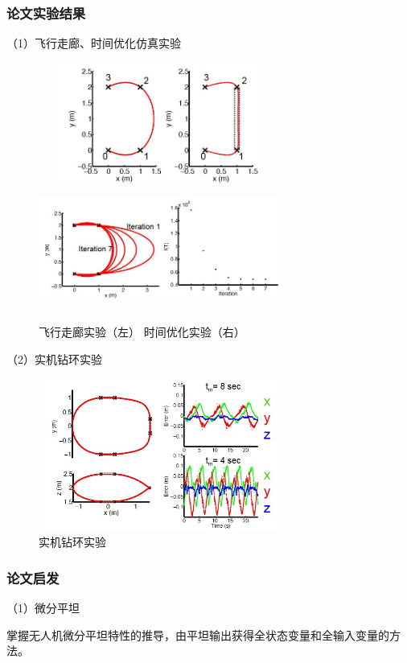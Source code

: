 \subsubsection{论文实验结果}
（1）飞行走廊、时间优化仿真实验
\begin{figure}[htbp]
    \centering
    \includegraphics[width=8cm, height=4cm]{image/minimumSnap1.jpg}
    \includegraphics[width=8cm, height=4cm]{image/minimumSnap2.jpg}
    \caption{飞行走廊实验（左）  时间优化实验（右）}\label{snap1}
\end{figure}



（2）实机钻环实验
\begin{figure}[htbp]
    \centering
    \includegraphics[width=8cm, height=5cm]{image/minimumSnap3.jpg}
    \caption{实机钻环实验}\label{snap3}
\end{figure}

\subsubsection{论文启发}
（1）微分平坦


掌握无人机微分平坦特性的推导，由平坦输出获得全状态变量和全输入变量的方法。


